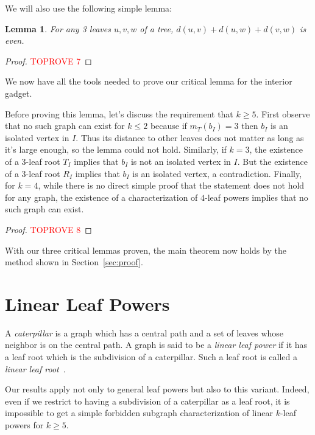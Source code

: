 \documentclass[11pt,letter]{article}
\newtheorem{lemma}[theorem]{Lemma}
\theoremstyle{remark}
\begin{document}
We will also use the following simple lemma:

\begin{lemma}\label{lem:even}
    For any 3 leaves $u,v,w$ of a tree, $d(u,v)+d(u,w)+d(v,w)$ is even.
\end{lemma}

\begin{proof}\textcolor{red}{TOPROVE 7}\end{proof}

We now have all the tools needed to prove our critical lemma for the interior gadget.


\ind*

Before proving this lemma, let's discuss the requirement that $k\ge 5$.
First observe that no such graph can exist for $k\leq 2$ because if $m_T(b_I)=3$ then $b_I$ is an isolated vertex in $I$. Thus its distance to other leaves does not matter as long as it's large enough, so the lemma could not hold.
Similarly, if $k=3$, the existence of a $3$-leaf root $T_I$ implies that $b_I$ is not an isolated vertex in $I$. But the existence of a $3$-leaf root $R_I$ implies that $b_I$ is an isolated vertex, a contradiction. 
Finally, for $k=4$, while there is no direct simple proof that the statement does not hold for any graph, 
the existence of a characterization of $4$-leaf powers implies that no such graph can exist.

\begin{proof}\textcolor{red}{TOPROVE 8}\end{proof}
With our three critical lemmas proven, the main theorem now holds
by the method shown in Section~\ref{sec:proof}.

\section{Linear Leaf Powers}\label{sec:linear}

A {\em caterpillar} is a graph which has a central path and a set of leaves whose neighbor is on the central path. A graph is said to be a \textit{linear leaf power} if it has a leaf root which is the subdivision of a caterpillar. Such a leaf root is called a \textit{linear leaf root}~\cite{Bergougnoux}.

Our results apply not only to general leaf powers but also to this variant. Indeed, even if we restrict to having a subdivision of a caterpillar as a leaf root, it is impossible to get a simple forbidden
subgraph characterization of linear $k$-leaf powers for $k \geq 5$.
\end{document}
